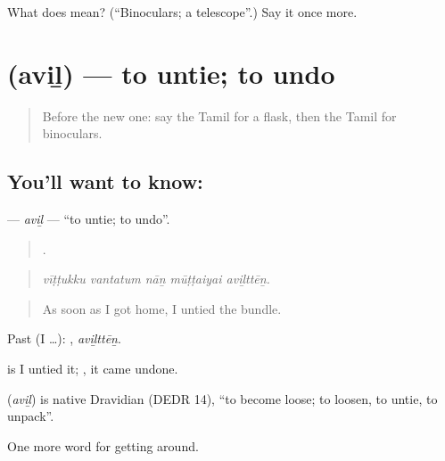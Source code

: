 \begin{tcolorbox}[breakable,colback=teal!4,colframe=teal!35!black,title={Before you move on}]
What does  mean? (\textquotedblleft{}Binoculars; a telescope\textquotedblright{}.) Say it once more.
\end{tcolorbox}
\section[\texorpdfstring{\ta{அவிழ்} (aviḻ)}{அவிழ் (aviḻ)}]{ (aviḻ) — to untie; to undo}

\label{lesson:TA-C422-avil}



\begin{quote}
Before the new one: say the Tamil for a flask, then the Tamil for binoculars.
\end{quote}

\subsection*{You'll want to know: }
\textbf{} — \emph{aviḻ} — \textquotedblleft{}to untie; to undo\textquotedblright{}.

\begin{quote}
    .
\end{quote}

\begin{quote}
\emph{vīṭṭukku vantatum nāṉ mūṭṭaiyai aviḻttēṉ.}
\end{quote}

\begin{quote}
As soon as I got home, I untied the bundle.
\end{quote}

Past (I …): , \emph{aviḻttēṉ}.

 is I untied it; , it came undone.

\begin{cousinweb}
\textbf{} (\emph{aviḻ}) is native Dravidian (DEDR 14), \textquotedblleft{}to become loose; to loosen, to untie, to unpack\textquotedblright{}.
\end{cousinweb}

\begin{grammarlens}[title={What you've built}]
One more word for getting around.
\end{grammarlens}

